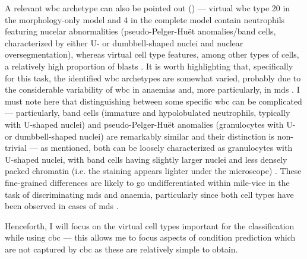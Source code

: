 A relevant \ac{wbc} archetype can also be pointed out () --- virtual \ac{wbc} type 20 in the morphology-only model and 4 in the complete model contain neutrophils featuring nucelar abnormalities (pseudo-Pelger-Huët anomalies/band cells, characterized by either U- or dumbbell-shaped nuclei \cite{Bain2005-zg} and nuclear oversegmentation), whereas virtual cell type features, among other types of cells, a relatively high proportion of blasts . It is worth highlighting that, specifically for this task, the identified \ac{wbc} archetypes are somewhat varied, probably due to the considerable variability of \ac{wbc} in anaemias and, more particularly, in \ac{mds} \cite{Bain2005-zg,Bain2014-oc}. I must note here that distinguishing between some specific \ac{wbc} can be complicated --- particularly, band cells (immature and hypolobulated neutrophils, typically with U-shaped nuclei) and pseudo-Pelger-Huët anomalies (granulocytes with U- or dumbbell-shaped nuclei) are remarkably similar and their distinction is non-trivial --- as mentioned, both can be loosely characterized as granulocytes with U-shaped nuclei, with band cells having slightly larger nuclei and less densely packed chromatin (i.e. the staining appears lighter under the microscope) \cite{Colella2012-so}. These fine-grained differences are likely to go undifferentiated within \ac{mile-vice} in the task of discriminating \ac{mds} and anaemia, particularly since both cell types have been observed in cases of \ac{mds} \cite{Davey1988-zn,Cunningham1995-pc}.

\begin{figure}[!ht]
    \label{fig:wbc-disease-detection-examples}
\end{figure}

Henceforth, I will focus on the virtual cell types important for the classification while using \ac{cbc} --- this allows me to focus aspects of condition prediction which are not captured by \ac{cbc} as these are relatively simple to obtain. 

